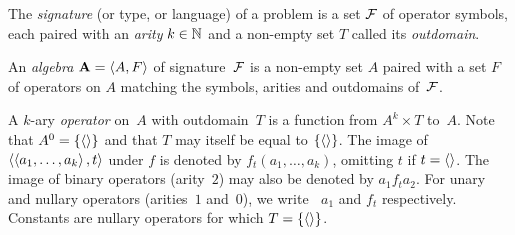 \begin{definition}
    \label{def:adp:alg}%
    The \emph{signature} (or type, or language) of a problem is a set \(\mathcal{F}\) of operator symbols, each paired with an \emph{arity} \(k \in \mathbb{N}\) and a non-empty set \(T\) called its \emph{outdomain}.

    An \emph{algebra} \(\mathbf{A} = \left\langle A, F\right\rangle\) of signature~\(\mathcal{F}\) is a non-empty set \(A\) paired with a set \(F\) of operators on \(A\) matching the symbols, arities and outdomains of~\(\mathcal{F}\).

    A \(k\)-ary \emph{operator} on~\(A\) with outdomain~\(T\) is a function from \(A^k \times T\) to~\(A\).
    Note that \(A^0 = \{\left\langle\right\rangle\}\) and that \(T\) may itself be equal to \(\{\left\langle\right\rangle\}\).
    The image of \(\left\langle\left\langle a_1, \hdots, a_k\right\rangle, t\right\rangle\) under \(f\) is denoted by \(f_t(a_1, \ldots, a_k)\), omitting \(t\) if \(t = \left\langle\right\rangle\).
    The image of binary operators (arity~\(2\)) may also be denoted by \(a_1 \mathbin{f_t} a_2\).
    For unary and nullary operators (arities~\(1\) and~\(0\)), we write \(\mathop{f_t} a_1\) and \(f_t\) respectively.
    Constants are nullary operators for which \(T = \{\left\langle\right\rangle\}\).
\end{definition}

